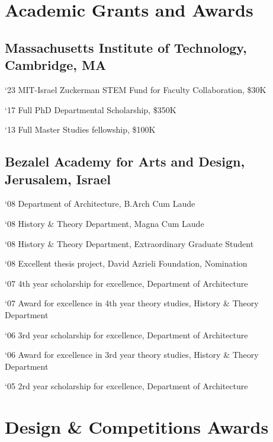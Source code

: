 \section*{Academic Grants and Awards}

\subsection*{Massachusetts Institute of Technology, Cambridge, MA}
\begin{tablist}
    \item[`23] \tab MIT-Israel Zuckerman STEM Fund for Faculty Collaboration, \$30K
	\item[`17] \tab Full PhD Departmental Scholarship, \$350K
	\item[`13] \tab Full Master Studies fellowship, \$100K
\end{tablist}
    
\subsection*{Bezalel Academy for Arts and Design, Jerusalem, Israel}
\begin{tablist}
	\item[`08] \tab Department of Architecture, B.Arch Cum Laude
	\item[`08] \tab History \& Theory Department, Magna Cum Laude
	\item[`08] \tab History \& Theory Department, Extraordinary Graduate Student
	\item[`08] \tab Excellent thesis project, David Azrieli Foundation, Nomination 
	\item[`07] \tab 4th year scholarship for excellence, Department of Architecture \item[`07]\tab  Award for excellence in 4th year theory studies, History \& Theory Department 
	\item[`06]\tab  3rd year scholarship for excellence, Department of Architecture \item[`06]\tab  Award for excellence in 3rd year theory studies, History \& Theory Department
	\item[`05]\tab  2rd year scholarship for excellence, Department of Architecture
	       
\end{tablist}
    
\section*{Design \& Competitions Awards}

